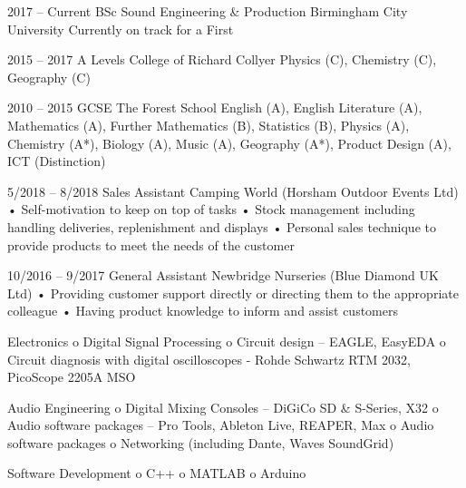 \documentclass[9pt]{developercv} %
\begin{document}


\begin{entrylist}
	\entry
		{2017 -- Current}
		{BSc Sound Engineering \& Production}
		{Birmingham City University}
		{Currently on track for a First}
		
	\entry
	{2015 -- 2017}
	{A Levels}
	{College of Richard Collyer}
	{Physics (C), Chemistry (C), Geography (C)}
	

	\entry
	{2010 -- 2015}
	{GCSE}
	{The Forest School}
	{English (A), English Literature (A), Mathematics (A), Further Mathematics (B), Statistics (B), Physics (A), Chemistry (A*), Biology (A), Music
(A), Geography (A*), Product Design (A), ICT (Distinction)}

\end{entrylist}


\begin{entrylist}
	\entry
		{5/2018 -- 8/2018}
		{Sales Assistant}
		{Camping World (Horsham Outdoor Events Ltd)}
		{• Self-motivation to keep on top of tasks
\newline• Stock management including handling deliveries, replenishment and displays
\newline• Personal sales technique to provide products to meet the needs of the customer}
		
	\entry
		{10/2016 -- 9/2017}
		{General Assistant}
		{Newbridge Nurseries (Blue Diamond UK Ltd)}
		{• Providing customer support directly or directing them to the appropriate colleague
\newline• Having product knowledge to inform and assist customers}

\end{entrylist}

\begin{entrylist}
\entry
		{}
		{Electronics}
		{}
		{o Digital Signal Processing
\newline o Circuit design – EAGLE, EasyEDA
\newline o Circuit diagnosis with digital oscilloscopes - Rohde Schwartz RTM 2032, PicoScope 2205A MSO}

\entry
		{}
		{Audio Engineering}
		{}
		{o Digital Mixing Consoles – DiGiCo SD \& S-Series, X32
\newline o Audio software packages – Pro Tools, Ableton Live, REAPER, Max
\newline o Audio software packages
\newline o Networking (including Dante, Waves SoundGrid)}

\entry
		{}
		{Software Development}
		{}
		{o C++
\newline o MATLAB
\newline o Arduino}
		
	\end{entrylist}
\end{document}
